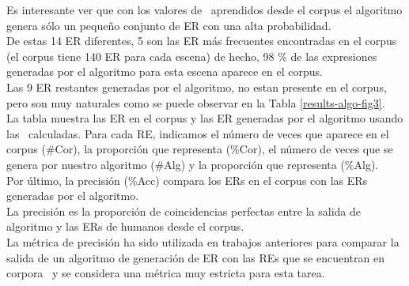  Es interesante ver que con los
valores de \puse\ aprendidos desde el corpus el algoritmo genera s\'olo un peque\~no conjunto de ER con una alta probabilidad.\\

De estas 14 ER diferentes, 5 son las ER m\'as frecuentes encontradas en el corpus (el corpus tiene 140 ER para cada escena) de hecho, 98 \% de las expresiones generadas por el algoritmo para esta escena aparece en el corpus.\\

Las 9 ER restantes generadas por el algoritmo, no estan presente en el corpus, pero son muy naturales como se puede observar en la Tabla
\ref{results-algo-fig3}.\\

La tabla muestra las ER en el corpus y las ER generadas por el algoritmo usando las \puse\ calculadas. Para cada RE, indicamos el n\'umero de veces que aparece en el corpus (\#Cor), la proporci\'on que representa (\%Cor), el n\'umero de veces que se genera por nuestro algoritmo (\#Alg) y la proporci\'on que representa (\%Alg). \\

Por \'ultimo, la precisi\'on (\%Acc) compara los ERs en el corpus con las ERs generadas por el algoritmo. \\

La precisi\'on es la proporci\'on de coincidencias perfectas entre la salida de algoritmo y las ERs de humanos desde el corpus. \\

La m\'etrica de precisi\'on ha sido utilizada en trabajos anteriores para comparar la salida de un algoritmo de generaci\'on de ER con las REs que se encuentran en corpora~\cite{sluis07:eval,viet:gene11} y se considera una m\'etrica muy estricta para esta tarea.



